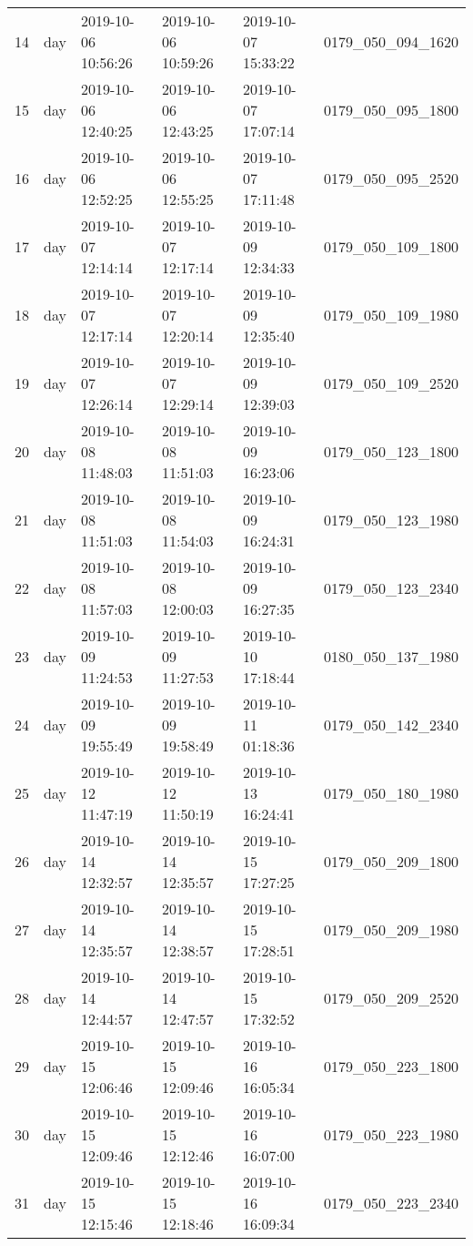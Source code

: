 \begin{longtable}{rlllll}
      14 &      day & 2019-10-06 10:56:26 & 2019-10-06 10:59:26 & 2019-10-07 15:33:22 & 0179\_050\_094\_1620 \\
      15 &      day & 2019-10-06 12:40:25 & 2019-10-06 12:43:25 & 2019-10-07 17:07:14 & 0179\_050\_095\_1800 \\
      16 &      day & 2019-10-06 12:52:25 & 2019-10-06 12:55:25 & 2019-10-07 17:11:48 & 0179\_050\_095\_2520 \\
      17 &      day & 2019-10-07 12:14:14 & 2019-10-07 12:17:14 & 2019-10-09 12:34:33 & 0179\_050\_109\_1800 \\
      18 &      day & 2019-10-07 12:17:14 & 2019-10-07 12:20:14 & 2019-10-09 12:35:40 & 0179\_050\_109\_1980 \\
      19 &      day & 2019-10-07 12:26:14 & 2019-10-07 12:29:14 & 2019-10-09 12:39:03 & 0179\_050\_109\_2520 \\
      20 &      day & 2019-10-08 11:48:03 & 2019-10-08 11:51:03 & 2019-10-09 16:23:06 & 0179\_050\_123\_1800 \\
      21 &      day & 2019-10-08 11:51:03 & 2019-10-08 11:54:03 & 2019-10-09 16:24:31 & 0179\_050\_123\_1980 \\
      22 &      day & 2019-10-08 11:57:03 & 2019-10-08 12:00:03 & 2019-10-09 16:27:35 & 0179\_050\_123\_2340 \\
      23 &      day & 2019-10-09 11:24:53 & 2019-10-09 11:27:53 & 2019-10-10 17:18:44 & 0180\_050\_137\_1980 \\
      24 &      day & 2019-10-09 19:55:49 & 2019-10-09 19:58:49 & 2019-10-11 01:18:36 & 0179\_050\_142\_2340 \\
      25 &      day & 2019-10-12 11:47:19 & 2019-10-12 11:50:19 & 2019-10-13 16:24:41 & 0179\_050\_180\_1980 \\
      26 &      day & 2019-10-14 12:32:57 & 2019-10-14 12:35:57 & 2019-10-15 17:27:25 & 0179\_050\_209\_1800 \\
      27 &      day & 2019-10-14 12:35:57 & 2019-10-14 12:38:57 & 2019-10-15 17:28:51 & 0179\_050\_209\_1980 \\
      28 &      day & 2019-10-14 12:44:57 & 2019-10-14 12:47:57 & 2019-10-15 17:32:52 & 0179\_050\_209\_2520 \\
      29 &      day & 2019-10-15 12:06:46 & 2019-10-15 12:09:46 & 2019-10-16 16:05:34 & 0179\_050\_223\_1800 \\
      30 &      day & 2019-10-15 12:09:46 & 2019-10-15 12:12:46 & 2019-10-16 16:07:00 & 0179\_050\_223\_1980 \\
      31 &      day & 2019-10-15 12:15:46 & 2019-10-15 12:18:46 & 2019-10-16 16:09:34 & 0179\_050\_223\_2340 \\

\end{longtable}
